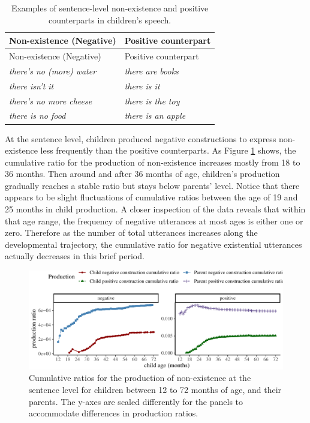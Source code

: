 \documentclass[
  english,
  man,floatsintext]{apa6}
\begin{document}
\begin{longtable}[]{@{}ll@{}}
\caption{\label{tab:nonexist} Examples of sentence-level non-existence and positive counterparts in children's speech.}\tabularnewline
\toprule
Non-existence (Negative) & Positive counterpart \\
\midrule
\endfirsthead
\toprule
Non-existence (Negative) & Positive counterpart \\
\midrule
\endhead
\emph{there's no (more) water} & \emph{there are books} \\
\emph{there isn't it} & \emph{there is it} \\
\emph{there's no more cheese} & \emph{there is the toy} \\
\emph{there is no food} & \emph{there is an apple} \\
\bottomrule
\end{longtable}

At the sentence level, children produced negative constructions to express non-existence less frequently than the positive counterparts. As Figure \ref{fig:existence} shows, the cumulative ratio for the production of non-existence increases mostly from 18 to 36 months. Then around and after 36 months of age, children's production gradually reaches a stable ratio but stays below parents' level. Notice that there appears to be slight fluctuations of cumulative ratios between the age of 19 and 25 months in child production. A closer inspection of the data reveals that within that age range, the frequency of negative utterances at most ages is either one or zero. Therefore as the number of total utterances increases along the developmental trajectory, the cumulative ratio for negative existential utterances actually decreases in this brief period.

\begin{figure}[H]

{\centering \includegraphics{neg_construction_article_files/figure-latex/existence-1} 

}

\caption{Cumulative ratios for the production of non-existence at the sentence level for children between 12 to 72 months of age, and their parents. The y-axes are scaled differently for the panels to accommodate differences in production ratios.}\label{fig:existence}
\end{figure}
\end{document}
